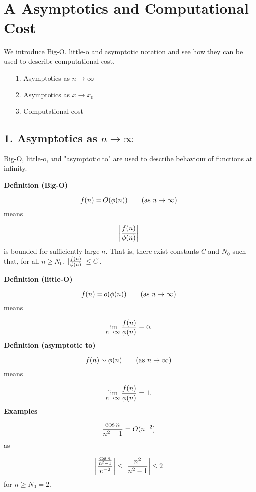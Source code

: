 \documentclass[12pt,a4paper]{article}
\begin{document}
\section{A Asymptotics and Computational Cost}
We introduce Big-O, little-o and asymptotic notation and see how they can be used to describe computational cost.

\begin{itemize}
\item[1. ] Asymptotics as $n \ensuremath{\rightarrow} \ensuremath{\infty}$


\item[2. ] Asymptotics as $x \ensuremath{\rightarrow} x_0$


\item[3. ] Computational cost

\end{itemize}
\subsection{1. Asymptotics as $n \ensuremath{\rightarrow} \ensuremath{\infty}$}
Big-O, little-o, and "asymptotic to" are used to describe behaviour of functions at infinity. 

\textbf{Definition (Big-O)} 

\[
f(n) = O(\ensuremath{\phi}(n)) \qquad \hbox{(as $n \ensuremath{\rightarrow} \ensuremath{\infty}$)}
\]
means

\[
\left|{f(n) \over \ensuremath{\phi}(n)}\right|
\]
is bounded for sufficiently large $n$. That is, there exist constants $C$ and $N_0$ such  that, for all $n \geq N_0$, $|{f(n) \over \ensuremath{\phi}(n)}| \leq C$.

\textbf{Definition (little-O)} 

\[
f(n) = o(\ensuremath{\phi}(n)) \qquad \hbox{(as $n \ensuremath{\rightarrow} \ensuremath{\infty}$)}
\]
means

\[
\lim_{n \ensuremath{\rightarrow} \ensuremath{\infty}} {f(n) \over \ensuremath{\phi}(n)} = 0.
\]
\textbf{Definition (asymptotic to)} 

\[
f(n) \ensuremath{\sim} \ensuremath{\phi}(n) \qquad \hbox{(as $n \ensuremath{\rightarrow} \ensuremath{\infty}$)}
\]
means

\[
\lim_{n \ensuremath{\rightarrow} \ensuremath{\infty}} {f(n) \over \ensuremath{\phi}(n)} = 1.
\]
\textbf{Examples}

\[
{\cos n \over n^2 -1} = O(n^{-2})
\]
as

\[
\left|{{\cos n \over n^2 -1} \over n^{-2}} \right| \leq \left| n^2 \over n^2 -1 \right|  \leq 2
\]
for $n \geq N_0 = 2$.
\end{document}
